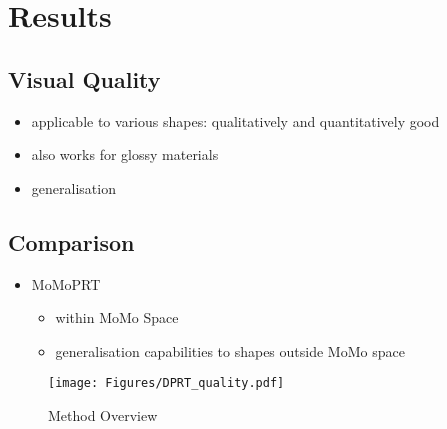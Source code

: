 \section{Results}
\subsection*{Visual Quality}
	\begin{itemize}
	\item applicable to various shapes: qualitatively and quantitatively good
	\item also works for glossy materials
	\item generalisation
	\end{itemize}
\subsection*{Comparison}
	\begin{itemize}
	\item MoMoPRT
		\begin{itemize}
		\item within MoMo Space
		\item generalisation capabilities to shapes outside MoMo space
		\end{itemize}
	\end{itemize}
\begin{figure*}[h]
  \centering
    \texttt{[image: Figures/DPRT\_quality.pdf]}
     \caption{Method Overview}
     \label{Fig: Method_Overview}
\end{figure*}